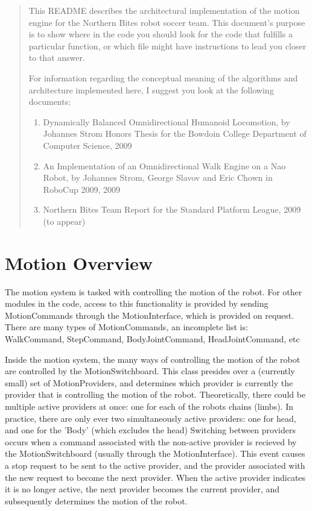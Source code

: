 \documentclass[11pt]{article}
\begin{document}
\begin{abstract}
This README describes the architectural implementation of the motion engine for
the Northern Bites robot soccer team. This document's purpose is to show where
in the code you should look for the code that fulfills a particular function,
or which file might have instructions to lead you closer to that answer.

For information regarding the conceptual meaning of the algorithms and
architecture implemented here, I suggest you look at the following documents:
\begin{enumerate}
\item Dynamically Balanced Omnidirectional Humanoid Locomotion, by Johannes Strom
   Honors Thesis for the Bowdoin College Department of Computer Science, 2009
\item  An Implementation of an Omnidirectional Walk Engine on a Nao Robot, by
   Johannes Strom, George Slavov and Eric Chown in RoboCup 2009, 2009
\item Northern Bites Team Report for the Standard Platform League, 2009 (to appear)
\end{enumerate}
\end{abstract}

\tableofcontents

\section{Motion Overview}
The motion system is tasked with controlling the motion of the robot. For other
modules in the code, access to this functionality is provided by sending
MotionCommands through the MotionInterface, which is provided on request.
There are many types of MotionCommands, an incomplete list is:
   WalkCommand, StepCommand, BodyJointCommand, HeadJointCommand, etc

Inside the motion system, the many ways of controlling the motion of the robot
are controlled by the MotionSwitchboard. This class presides over a (currently
small) set of MotionProviders, and determines which provider is currently the
provider that is controlling the motion of the robot.  Theoretically, there
could be multiple active providers at once: one for each of the robots chains
(limbs). In practice, there are only ever two simultaneously active providers:
one for head, and one for the 'Body' (which excludes the head)
Switching between providers occurs when a command associated with the non-active
provider is recieved by the MotionSwitchboard (usually through the
MotionInterface). This event causes a stop request to be sent to the active
provider, and the provider associated with the new request to become the
next provider.  When the active provider indicates it is no longer active,
the next provider becomes the current provider, and subsequently determines
the motion of the robot.
\end{document}
